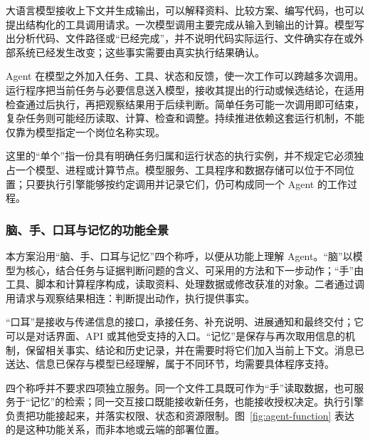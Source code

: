 \documentclass[11pt,a4paper]{article}
\begin{document}
大语言模型接收上下文并生成输出，可以解释资料、比较方案、编写代码，也可以提出结构化的工具调用请求。一次模型调用主要完成从输入到输出的计算。模型写出分析代码、文件路径或“已经完成”，并不说明代码实际运行、文件确实存在或外部系统已经发生改变；这些事实需要由真实执行结果确认。

Agent 在模型之外加入任务、工具、状态和反馈，使一次工作可以跨越多次调用。运行程序把当前任务与必要信息送入模型，接收其提出的行动或候选结论，在适用检查通过后执行，再把观察结果用于后续判断。简单任务可能一次调用即可结束，复杂任务则可能经历读取、计算、检查和调整。持续推进依赖这套运行机制，不能仅靠为模型指定一个岗位名称实现。

这里的“单个”指一份具有明确任务归属和运行状态的执行实例，并不规定它必须独占一个模型、进程或计算节点。模型服务、工具程序和数据存储可以位于不同位置；只要执行引擎能够按约定调用并记录它们，仍可构成同一个 Agent 的工作过程。

\subsubsection{脑、手、口耳与记忆的功能全景}

本方案沿用“脑、手、口耳与记忆”四个称呼，以便从功能上理解 Agent。“脑”以模型为核心，结合任务与证据判断问题的含义、可采用的方法和下一步动作；“手”由工具、脚本和计算程序构成，读取资料、处理数据或修改获准的对象。二者通过调用请求与观察结果相连：判断提出动作，执行提供事实。

“口耳”是接收与传递信息的接口，承接任务、补充说明、进展通知和最终交付；它可以是对话界面、API 或其他受支持的入口。“记忆”是保存与再次取用信息的机制，保留相关事实、结论和历史记录，并在需要时将它们加入当前上下文。消息已送达、信息已保存与模型已经理解，属于不同环节，均需要具体程序支持。

四个称呼并不要求四项独立服务。同一个文件工具既可作为“手”读取数据，也可服务于“记忆”的检索；同一交互接口既能接收新任务，也能接收授权决定。执行引擎负责把功能接起来，并落实权限、状态和资源限制。图~\ref{fig:agent-function} 表达的是这种功能关系，而非本地或云端的部署位置。
\end{document}
